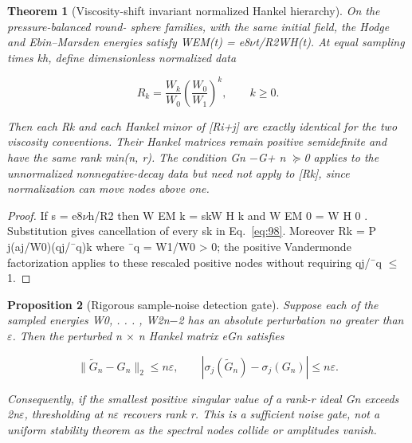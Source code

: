 \documentclass[10pt,letterpaper]{article}
\newtheorem{theorem}{Theorem}[section]
\newtheorem{proposition}[theorem]{Proposition}
\theoremstyle{remark}
\begin{document}
\begin{theorem}[Viscosity-shift invariant normalized Hankel hierarchy]

On the pressure-balanced round- sphere families, with the same initial field, the Hodge and Ebin–Marsden energies satisfy WEM(t) = e8\(\nu \)t/R2WH(t). At equal sampling times kh, define dimensionless normalized data


\begin{equation}
\tag{98}\label{eq:98}
R_k=\frac{W_k}{W_0}\left(\frac{W_0}{W_1}\right)^k,\qquad k\ge0.
\end{equation}

Then each Rk and each Hankel minor of [Ri+j] are exactly identical for the two viscosity conventions. Their Hankel matrices remain positive semidefinite and have the same rank min(n, r). The condition Gn \(- \)G+ n \(\succeq \)0 applies to the unnormalized nonnegative-decay data but need not apply to [Rk], since normalization can move nodes above one.


\end{theorem}

\begin{proof}
If s = e8\(\nu \)h/R2 then W EM k = skW H k and W EM 0 = W H 0 . Substitution gives cancellation of every sk in Eq.~\eqref{eq:98}. Moreover Rk = P j(aj/W0)(qj/¯q)k where ¯q = W1/W0 > 0; the positive Vandermonde factorization applies to these rescaled positive nodes without requiring qj/¯q \(\le \)1.

\end{proof}

\begin{proposition}[Rigorous sample-noise detection gate]

Suppose each of the sampled energies W0, . . . , W2n\(- \)2 has an absolute perturbation no greater than \(\varepsilon \). Then the perturbed n \(\times \) n Hankel matrix eGn satisfies


\begin{equation}
\tag{99}\label{eq:99}
\|\widetilde G_n-G_n\|_2\le n\varepsilon,\qquad|\sigma_j(\widetilde G_n)-\sigma_j(G_n)|\le n\varepsilon.
\end{equation}

Consequently, if the smallest positive singular value of a rank-r ideal Gn exceeds 2n\(\varepsilon \), thresholding at n\(\varepsilon \) recovers rank r. This is a sufficient noise gate, not a uniform stability theorem as the spectral nodes collide or amplitudes vanish.


\end{proposition}
\end{document}
